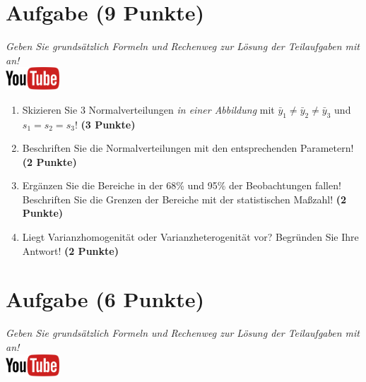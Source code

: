 \documentclass[a4paper, 10pt]{scrartcl}\usepackage[]{graphicx}\usepackage[]{xcolor}
\begin{document}
 
\clearpage

\section{Aufgabe \hfill (9 Punkte)}

\textit{Geben Sie grunds{\"a}tzlich Formeln und Rechenweg zur L{\"o}sung der
  Teilaufgaben mit an!} \\[1Ex]

\hfill\href{https://youtu.be/ZrJhn2wPbq4}{\includegraphics[width =
  2cm]{img/youtube}}\\[1Ex]



\begin{enumerate}
\item Skizieren Sie $3$ Normalverteilungen \textit{in einer
    Abbildung} mit $\bar{y}_1 \neq \bar{y}_2 \neq \bar{y}_3$ und $s_1 = s_2 = s_3$! \textbf{(3 Punkte)}
\item Beschriften Sie die Normalverteilungen mit den entsprechenden
  Parametern! \textbf{(2 Punkte)}
\item Erg{\"a}nzen Sie die Bereiche in der 68\% und 95\% der Beobachtungen
  fallen! Beschriften Sie die Grenzen der Bereiche mit der statistischen Ma{\ss}zahl! \textbf{(2 Punkte)}
\item Liegt Varianzhomogenit{\"a}t oder Varianzheterogenit{\"a}t vor? Begr{\"u}nden Sie
  Ihre Antwort! \textbf{(2 Punkte)}
\end{enumerate}

 
\clearpage

\section{Aufgabe \hfill (6 Punkte)}

\textit{Geben Sie grunds{\"a}tzlich Formeln und Rechenweg zur L{\"o}sung der
  Teilaufgaben mit an!} \\[1Ex]

\hfill\href{https://youtu.be/aXvxGC4YLqk}{\includegraphics[width =
  2cm]{img/youtube}}\\[1Ex]
\end{document}
